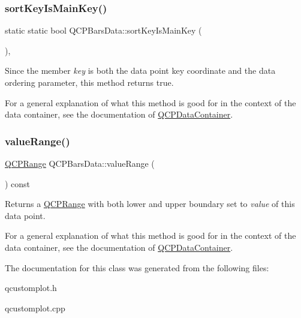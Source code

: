 \subsubsection{\texorpdfstring{sort\+Key\+Is\+Main\+Key()}{sortKeyIsMainKey()}}
{\footnotesize\ttfamily static static bool Q\+C\+P\+Bars\+Data\+::sort\+Key\+Is\+Main\+Key (\begin{DoxyParamCaption}{ }\end{DoxyParamCaption})\hspace{0.3cm}{\ttfamily [inline]}, {\ttfamily [static]}}

Since the member {\itshape key} is both the data point key coordinate and the data ordering parameter, this method returns true.

For a general explanation of what this method is good for in the context of the data container, see the documentation of \hyperlink{classQCPDataContainer}{Q\+C\+P\+Data\+Container}. \mbox{\label{classQCPBarsData_acf3e6479dacacd6c81eebe7d4cd62185}} 
\subsubsection{\texorpdfstring{value\+Range()}{valueRange()}}
{\footnotesize\ttfamily \hyperlink{classQCPRange}{Q\+C\+P\+Range} Q\+C\+P\+Bars\+Data\+::value\+Range (\begin{DoxyParamCaption}{ }\end{DoxyParamCaption}) const\hspace{0.3cm}{\ttfamily [inline]}}

Returns a \hyperlink{classQCPRange}{Q\+C\+P\+Range} with both lower and upper boundary set to {\itshape value} of this data point.

For a general explanation of what this method is good for in the context of the data container, see the documentation of \hyperlink{classQCPDataContainer}{Q\+C\+P\+Data\+Container}. 

The documentation for this class was generated from the following files\+:\begin{DoxyCompactItemize}
\item 
qcustomplot.\+h\item 
qcustomplot.\+cpp\end{DoxyCompactItemize}
